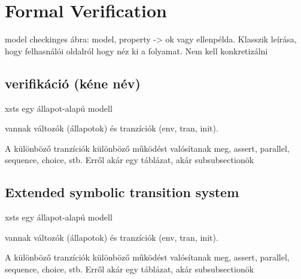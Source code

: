 \section{Formal Verification}\label{sec:formal_verification}

model checkinges ábra: model, property -> ok vagy ellenpélda. Klasszik leírása, hogy felhasnálói oldalról hogy néz ki a folyamat. Nem kell konkretizálni


\subsection{verifikáció (kéne név)}

xsts egy állapot-alapú modell

vannak változók (állapotok) és tranzíciók (env, tran, init).

A különböző tranzíciók különböző működést valósítanak meg, assert, parallel, sequence, choice, stb. Erről akár egy táblázat, akár subsubsectionök


\subsection{Extended symbolic transition system}

xsts egy állapot-alapú modell

vannak változók (állapotok) és tranzíciók (env, tran, init).

A különböző tranzíciók különböző működést valósítanak meg, assert, parallel, sequence, choice, stb. Erről akár egy táblázat, akár subsubsectionök
